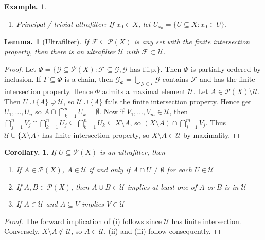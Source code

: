 \documentclass[11pt, a4paper]{memoir}
\theoremstyle{change}
\newtheorem{lemma}[theorem]{Lemma.}
\newtheorem{corollary}[theorem]{Corollary.}
\theoremstyle{plain}
\theoremstyle{nonumberplain}
\newtheorem{example}{Example.}
\newtheorem{proof}{Proof}
\numberwithin{equation}{section}
\begin{document}
\begin{example}
    \begin{enumerate}[nl,r]
        \item \textit{Principal / trivial ultrafilter:} If $x_0\in X$, let $U_{x_0}=\{U\subseteq X:x_0\in U\}$.
    \end{enumerate}
\end{example}
\begin{lemma}[Ultrafilter]
    If $\mathcal{F}\subseteq\mathcal{P}(X)$ is any set with the finite intersection property, then there is an ultrafilter $\mathcal{U}$ with $\mathcal{F}\subset\mathcal{U}$.
\end{lemma}
\begin{proof}
    Let $\Phi=\{\mathcal{G}\subseteq\mathcal{P}(X):\mathcal{F}\subseteq\mathcal{G},\mathcal{G}\text{ has f.i.p.}\}$.
    Then $\Phi$ is partially ordered by inclusion.
    If $\Gamma\subseteq\Phi$ is a chain, then $\mathcal{G}_\Phi=\bigcup_{\mathcal{G}\in\Gamma}\mathcal{G}$ contains $\mathcal{F}$ and has the finite intersection property.
    Hence $\Phi$ admits a maximal element $\mathcal{U}$.
    Let $A\in\mathcal{P}(X)\setminus\mathcal{U}$.
    Then $U\cup\{A\}\supsetneq\mathcal{U}$, so $\mathcal{U}\cup\{A\}$ fails the finite intersection property.
    Hence get $U_1,\ldots,U_n$ so $A\cap\bigcap_{k=1}^n U_k=\emptyset$.
    Now if $V_1,\ldots,V_m\in\mathcal{U}$, then $\bigcap_{j=1}^n V_j\cap\bigcap_{k=1}^n U_j\subseteq\bigcap_{k=1}^n U_k\subseteq X\setminus A$, so $(X\setminus A)\cap\bigcap_{j=1}^m V_j$.
    Thus $\mathcal{U}\cup\{X\setminus A\}$ has finite intersection property, so $X\setminus A\in\mathcal{U}$ by maximality.
\end{proof}
\begin{corollary}
    If $U\subseteq\mathcal{P}(X)$ is an ultrafilter, then
    \begin{enumerate}[nl,r]
        \item If $A\in\mathcal{P}(X)$, $A\in\mathcal{U}$ if and only if $A\cap U\neq\emptyset$ for each $U\in\mathcal{U}$
        \item If $A,B\in\mathcal{P}(X)$, then $A\cup B\in\mathcal{U}$ implies at least one of $A$ or $B$ is in $\mathcal{U}$
        \item If $A\in\mathcal{U}$ and $A\subseteq V$ implies $V\in\mathcal{U}$
    \end{enumerate}
\end{corollary}
\begin{proof}
    The forward implication of (i) follows since $\mathcal{U}$ has finite intersection.
    Conversely, $X\setminus A\notin\mathcal{U}$, so $A\in\mathcal{U}$.
    (ii) and (iii) follow consequently.
\end{proof}
\end{document}
